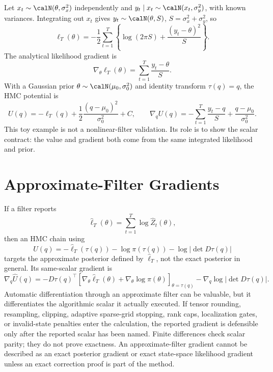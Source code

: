 \begin{remark}
\label{ex:bf-hd-scalar-gaussian-gradient}
Let \(x_t\sim\calN(\theta,\sigma_x^2)\) independently and
\(y_t\mid x_t\sim\calN(x_t,\sigma_y^2)\), with known variances.  Integrating
out \(x_t\) gives \(y_t\sim\calN(\theta,S)\), \(S=\sigma_x^2+\sigma_y^2\), so
\[
  \ell_T(\theta)
  =
  -\frac12\sum_{t=1}^T
  \left\{\log(2\pi S)+\frac{(y_t-\theta)^2}{S}\right\}.
\]
The analytical likelihood gradient is
\[
  \nabla_\theta\ell_T(\theta)
  =
  \sum_{t=1}^T\frac{y_t-\theta}{S}.
\]
With a Gaussian prior \(\theta\sim\calN(\mu_0,\sigma_0^2)\) and identity
transform \(\tau(q)=q\), the HMC potential is
\[
  U(q)=-\ell_T(q)+\frac12\frac{(q-\mu_0)^2}{\sigma_0^2}+C,
  \qquad
  \nabla_q U(q)
  =
  -\sum_{t=1}^T\frac{y_t-q}{S}
  +\frac{q-\mu_0}{\sigma_0^2}.
  \label{eq:bf-hd-scalar-gaussian-hmc-gradient}
\]
This toy example is not a nonlinear-filter validation.  Its role is to show
the scalar contract: the value and gradient both come from the same integrated
likelihood and prior.
\end{remark}

\section{Approximate-Filter Gradients}
\label{sec:bf-hd-approx-filter-gradients}

If a filter reports
\[
  \widehat\ell_T(\theta)=\sum_{t=1}^T\log\widehat Z_t(\theta),
\]
then an HMC chain using
\[
  \widehat U(q)
  =
  -\widehat\ell_T(\tau(q))-\log\pi(\tau(q))
  -\log|\det D\tau(q)|
  \label{eq:bf-hd-approx-hmc-potential}
\]
targets the approximate posterior defined by \(\widehat\ell_T\), not the exact
posterior in general.  Its same-scalar gradient is
\[
  \nabla_q \widehat U(q)
  =
  -D\tau(q)^\top
  \left[
  \nabla_\theta\widehat\ell_T(\theta)+
  \nabla_\theta\log\pi(\theta)
  \right]_{\theta=\tau(q)}
  -
  \nabla_q\log|\det D\tau(q)|.
  \label{eq:bf-hd-approx-hmc-gradient}
\]
Automatic differentiation through an approximate filter can be valuable, but it
differentiates the algorithmic scalar it actually executed.  If tensor
rounding, resampling, clipping, adaptive sparse-grid stopping, rank caps,
localization gates, or invalid-state penalties enter the calculation, the
reported gradient is defensible only after the reported scalar has been named.
Finite differences check scalar parity; they do not prove exactness.  An
approximate-filter gradient cannot be described as an exact posterior gradient
or exact state-space likelihood gradient unless an exact correction proof is
part of the method.

